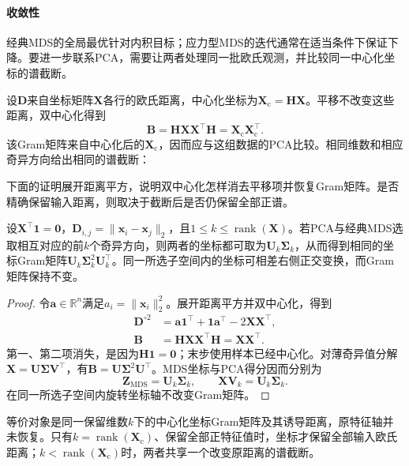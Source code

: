 \paragraph{收敛性}

经典MDS的全局最优针对内积目标；应力型MDS的迭代通常在适当条件下保证下降。要进一步联系PCA，需要让两者处理同一批欧氏观测，并比较同一中心化坐标的谱截断。

设$\bm{D}$来自坐标矩阵$\bm{X}$各行的欧氏距离，中心化坐标为$\bm{X}_{\mathrm{c}}=\bm{H}\bm{X}$。平移不改变这些距离，双中心化得到
\[
  \bm{B}=\bm{H}\bm{X}\bm{X}^{\top}\bm{H}
  =\bm{X}_{\mathrm{c}}\bm{X}_{\mathrm{c}}^{\top}.
\]
该Gram矩阵来自中心化后的$\bm{X}_{\mathrm{c}}$，因而应与这组数据的PCA比较。相同维数和相应奇异方向给出相同的谱截断：

下面的证明展开距离平方，说明双中心化怎样消去平移项并恢复Gram矩阵。是否精确保留输入距离，则取决于截断后是否仍保留全部正谱。

\begin{theorem}[欧氏距离下经典MDS与PCA的关系]
  \label{thm:dim-mds-pca}
  设$\bm{X}^{\top}\bm{1}=\bm{0}$，$\bm{D}_{i,j}=\lVert\bm{x}_i-\bm{x}_j\rVert_2$，且$1\leq k\leq\operatorname{rank}(\bm{X})$。若PCA与经典MDS选取相互对应的前$k$个奇异方向，则两者的坐标都可取为$\bm{U}_k\bm{\Sigma}_k$，从而得到相同的坐标Gram矩阵$\bm{U}_k\bm{\Sigma}_k^2\bm{U}_k^{\top}$。同一所选子空间内的坐标可相差右侧正交变换，而Gram矩阵保持不变。
\end{theorem}
\begin{proof}
  令$\bm{a}\in\mathbb{R}^n$满足$a_i=\lVert\bm{x}_i\rVert_2^2$。展开距离平方并双中心化，得到
  \[
    \begin{aligned}
      \bm{D}^{\circ2}
        &=\bm{a}\bm{1}^{\top}+\bm{1}\bm{a}^{\top}
          -2\bm{X}\bm{X}^{\top},\\
      \bm{B}
        &=\bm{H}\bm{X}\bm{X}^{\top}\bm{H}
         =\bm{X}\bm{X}^{\top}.
    \end{aligned}
  \]
  第一、第二项消失，是因为$\bm{H}\bm{1}=\bm{0}$；末步使用样本已经中心化。对薄奇异值分解$\bm{X}=\bm{U}\bm{\Sigma}\bm{V}^{\top}$，有$\bm{B}=\bm{U}\bm{\Sigma}^2\bm{U}^{\top}$。MDS坐标与PCA得分因而分别为
  \[
    \bm{Z}_{\mathrm{MDS}}=\bm{U}_k\bm{\Sigma}_k,
    \qquad
    \bm{X}\bm{V}_k=\bm{U}_k\bm{\Sigma}_k.
  \]
  在同一所选子空间内旋转坐标轴不改变Gram矩阵。
\end{proof}

等价对象是同一保留维数$k$下的中心化坐标Gram矩阵及其诱导距离，原特征轴并未恢复。只有$k=\operatorname{rank}(\bm{X}_{\mathrm{c}})$、保留全部正特征值时，坐标才保留全部输入欧氏距离；$k<\operatorname{rank}(\bm{X}_{\mathrm{c}})$时，两者共享一个改变原距离的谱截断。

